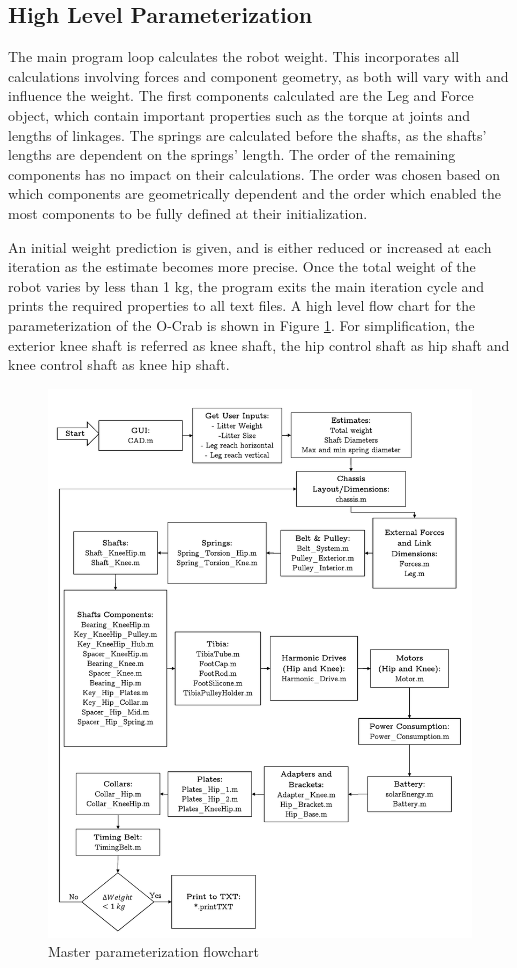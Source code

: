 \subsection{High Level Parameterization}

The main program loop calculates the robot weight. This incorporates all calculations involving forces and component geometry, as both will vary with and influence the weight. The first components calculated are the Leg and Force object, which contain important properties such as the torque at joints and lengths of linkages. The springs are calculated before the shafts, as the shafts' lengths are dependent on the springs' length. The order of the remaining components has no impact on their calculations. The order was chosen based on which components are geometrically dependent and the order which enabled the most components to be fully defined at their initialization.

An initial weight prediction is given, and is either reduced or increased at each iteration as the estimate becomes more precise. Once the total weight of the robot varies by less than 1 kg, the program exits the main iteration cycle and prints the required properties to all text files. A high level flow chart for the parameterization of the O-Crab is shown in Figure \ref{fig:parametrization_flowchart}. For simplification, the exterior knee shaft is referred as knee shaft, the hip control shaft as hip shaft and knee control shaft as knee hip shaft.

\begin{figure}
    \centering
    \includegraphics[width=\textwidth]{3_Parametrization/img/HighLevelFlowChart.pdf}
    \caption{Master parameterization flowchart}
    \label{fig:parametrization_flowchart}
\end{figure}{}